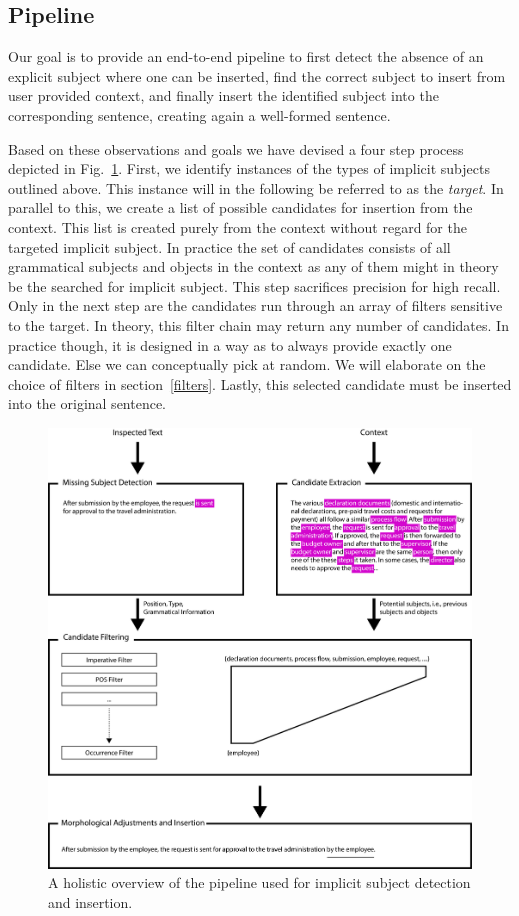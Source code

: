 \documentclass[times, 10pt,twocolumn]{article}
\begin{document}
\subsection{Pipeline}
Our goal is to provide an end-to-end pipeline to first detect the absence of an explicit subject where one
can be inserted, find the correct subject to insert from user provided context, and finally
insert the identified subject into the corresponding sentence, creating again a well-formed sentence. 

Based on these observations and goals we have devised a four step process depicted in Fig.~\ref{fig:pipeline}.
First, we identify
instances of the types of implicit subjects outlined above. This instance will in the following be 
referred to as the \textit{target}. In parallel to this, we create a list of possible
candidates for insertion from the context. This list is created purely from the context without regard
for the targeted implicit subject. In practice the set of candidates consists of all grammatical
subjects and objects in the context as any of them might in theory be the searched for implicit subject.
This step sacrifices precision for high recall.
Only in the next step are the candidates run through an array of filters sensitive to the target.
In theory, this filter chain may return any number of candidates. In practice though, it is
designed in a way as to always provide exactly one candidate. Else we can conceptually pick at random.
We will elaborate on the choice of filters in section~\ref{filters}. %
Lastly, this selected candidate must be inserted into the original sentence.

\begin{figure}
   \centering
   \includegraphics[width=\textwidth]{pipeline}
   \caption{A holistic overview of the pipeline used for implicit subject detection and insertion.}
   \label{fig:pipeline}
\end{figure}
\end{document}
